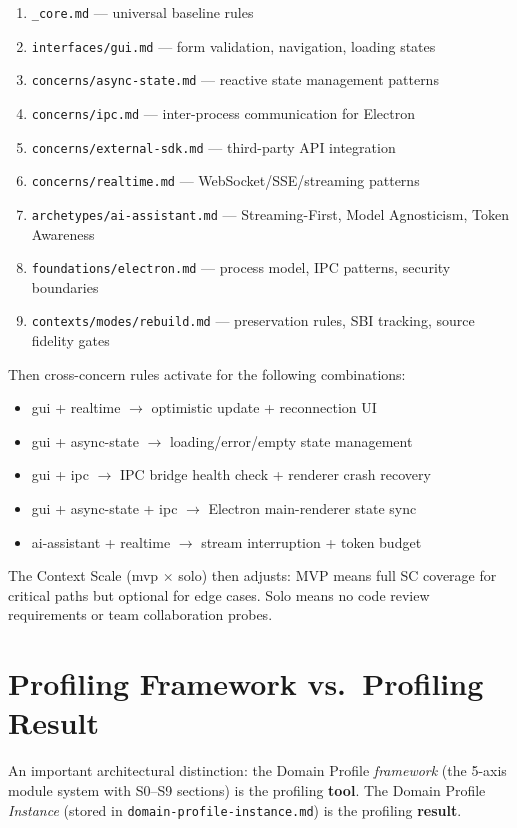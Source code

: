 \documentclass[11pt,a4paper,openright,twoside]{report}
\newcommand{\file}[1]{\texttt{#1}}
\begin{document}
\begin{enumerate}
  \item \file{\_core.md} --- universal baseline rules
  \item \file{interfaces/gui.md} --- form validation, navigation, loading states
  \item \file{concerns/async-state.md} --- reactive state management patterns
  \item \file{concerns/ipc.md} --- inter-process communication for Electron
  \item \file{concerns/external-sdk.md} --- third-party API integration
  \item \file{concerns/realtime.md} --- WebSocket/SSE/streaming patterns
  \item \file{archetypes/ai-assistant.md} --- Streaming-First, Model Agnosticism, Token Awareness
  \item \file{foundations/electron.md} --- process model, IPC patterns, security boundaries
  \item \file{contexts/modes/rebuild.md} --- preservation rules, SBI tracking, source fidelity gates
\end{enumerate}

Then cross-concern rules activate for the following combinations:
\begin{itemize}
  \item gui + realtime $\rightarrow$ optimistic update + reconnection UI
  \item gui + async-state $\rightarrow$ loading/error/empty state management
  \item gui + ipc $\rightarrow$ IPC bridge health check + renderer crash recovery
  \item gui + async-state + ipc $\rightarrow$ Electron main-renderer state sync
  \item ai-assistant + realtime $\rightarrow$ stream interruption + token budget
\end{itemize}

The Context Scale (mvp $\times$ solo) then adjusts: MVP means full SC coverage for critical paths but optional for edge cases. Solo means no code review requirements or team collaboration probes.

\section{Profiling Framework vs.\ Profiling Result}

An important architectural distinction: the Domain Profile \emph{framework} (the 5-axis module system with S0--S9 sections) is the profiling \textbf{tool}. The Domain Profile \emph{Instance} (stored in \file{domain-profile-instance.md}) is the profiling \textbf{result}.
\end{document}
